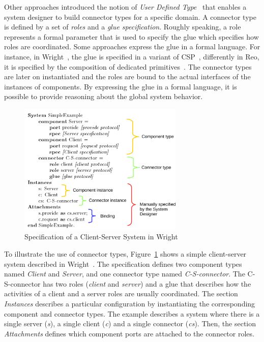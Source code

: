 Other approaches introduced the notion of \emph{User Defined Type}~\cite{uniconbib,wrightbib,reobib} that enables a system designer to build connector types for a specific domain. A connector type is defined by a set of \emph{roles} and a \emph{glue specification}. Roughly speaking, a role represents a formal parameter that is used to specify the glue which specifies how roles are coordinated. Some approaches express the glue in a formal language. For instance, in Wright~\cite{wrightbib}, the glue is specified in a variant of CSP~\cite{csphoarebib}, differently in Reo, it is specified by the composition of dedicated primitives~\cite{reobib}. The connector types are later on instantiated and the roles are bound to the actual interfaces of the instances of components. By expressing the glue in a formal language, it is possible to provide reasoning about the global system behavior. 

\begin{figure}
	\begin{center}
		\includegraphics[width=0.7\textwidth]{background/figs/wrightspec}
		\caption{Specification of a Client-Server System in Wright~\cite{wrightbib}}
		\label{fig:wrightspec}
	\end{center}
\end{figure}

To illustrate the use of connector types, Figure~\ref{fig:wrightspec} shows a simple client-server system described in Wright~\cite{wrightbib}. The specification defines two component types named \emph{Client} and \emph{Server}, and one connector type named \emph{C-S-connector}. The C-S-connector has two roles (\emph{client} and \emph{server}) and a glue that describes how the activities of a client and a server roles are usually coordinated. The section \emph{Instances} describes a particular configuration by instantiating the corresponding component and connector types. The example describes a system where there is a single server (\emph{s}), a single client (\emph{c}) and a single connector (\emph{cs}). Then, the section \emph{Attachments} defines which component ports are attached to the connector roles.


